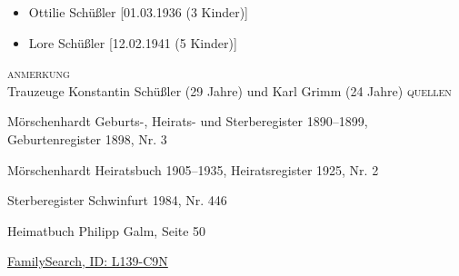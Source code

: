 \begin{person}[
    surname = {Schüßler},
    givenname = {Johann Georg},
    suffix = {1898--1984},
    label = {@I172@},
    filename = {Johann Georg Schüßler (1898)}
    ]
\begin{itemize}
\item Ottilie Schüßler [01.03.1936 (3 Kinder)]
\item Lore Schüßler [12.02.1941 (5 Kinder)]
\end{itemize}
\medbreak
\textsc{anmerkung}\\
Trauzeuge Konstantin Schüßler (29 Jahre) und Karl Grimm (24 Jahre)
\medbreak
\textsc{{quellen}}
\begin{enumerate}[label={[\arabic*]}]
\item Mörschenhardt Geburts-, Heirats- und Sterberegister 1890–1899, Geburtenregister 1898, Nr. 3
\item Mörschenhardt Heiratsbuch 1905–1935, Heiratsregister 1925, Nr. 2
\item Sterberegister Schwinfurt 1984, Nr. 446
\item Heimatbuch Philipp Galm, Seite 50
\item \href{https://www.familysearch.org/tree/person/details/L139-C9N}{FamilySearch, ID: L139-C9N}
\end{enumerate}

\end{person}

